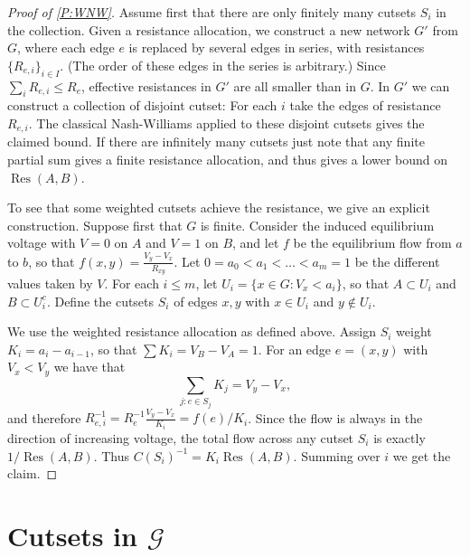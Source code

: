 \documentclass[12pt]{article}
\theoremstyle{definition}
\numberwithin{equation}{section}
\newcommand{\note}[1]{{\bf \textcolor{red}{[#1]}}}
\newcommand{\cG}{\mathcal{G}}
\newcommand{\Res}{\operatorname{Res}}
\begin{document}
\begin{proof}[Proof of \cref{P:WNW}]
  Assume first that there are only finitely many cutsets $S_i$ in the collection.
  Given a resistance allocation, we construct a new network $G'$ from $G$, where each edge $e$ is replaced by several edges in series, with resistances
  $\{R_{e,i}\}_{i\in I}$.
  (The order of these edges in the series is arbitrary.)
  Since $\sum_i R_{e,i} \leq R_e$, effective resistances in $G'$ are all smaller than in $G$.
  In $G'$ we can construct a collection of disjoint cutset:
  For each $i$ take the edges of resistance $R_{e,i}$.
  The classical Nash-Williams applied to these disjoint cutsets gives the claimed bound.
  If there are infinitely many cutsets just note that any finite partial sum gives a finite resistance allocation, and thus gives a lower bound on $\Res(A,B)$.

  To see that some weighted cutsets achieve the resistance, we give an explicit construction.
  Suppose first that $G$ is finite.
  Consider the induced equilibrium voltage with $V=0$ on $A$ and $V=1$ on $B$, and let $f$ be the equilibrium flow from $a$ to $b$, so that $f(x,y) = \frac{V_y-V_x}{R_{xy}}$.
  Let $0 = a_0 < a_1 < \dots < a_m = 1$ be the different values taken by $V$.
  For each $i\le m$, let $U_i = \{x\in G : V_x < a_i\}$, so that $A\subset U_i$ and $B \subset U_i^c$.
  Define the cutsets $S_i$ of edges $x,y$ with $x\in U_i$ and $y\not\in U_i$.

  We use the weighted resistance allocation as defined above.
  Assign $S_i$ weight $K_i = a_i-a_{i-1}$, so that $\sum K_i = V_B-V_A=1$.
  For an edge $e=(x,y)$ with $V_x<V_y$ we have that
  \[ \sum_{j : e\in S_j} K_j = V_y-V_x, \]
  and therefore $R_{e,i}^{-1} = R_e^{-1} \frac{V_y-V_x}{K_i} = f(e)/K_i$.
  Since the flow is always in the direction of increasing voltage, the total flow across any cutset $S_i$ is exactly $1/\Res(A,B)$.
  Thus $C(S_i)^{-1} = K_i \Res(A,B)$.
  Summing over $i$ we get the claim.
\end{proof}



\section{Cutsets in $\cG$}
\label{sec:cutsets}

\end{document}
